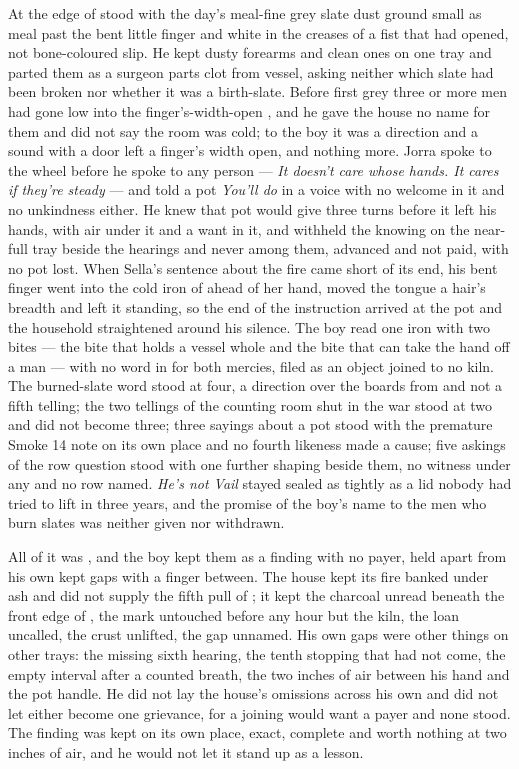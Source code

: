 At the edge of   stood with the day's meal-fine grey slate dust ground small as meal past the bent little finger and white in the creases of a fist that had opened, not bone-coloured slip. He kept dusty forearms and clean ones on one tray and parted them as a surgeon parts clot from vessel, asking neither which slate had been broken nor whether it was a birth-slate. Before first grey three or more men had gone low into the finger's-width-open , and he gave the house no name for them and did not say the room was cold; to the boy it was a direction and a sound with a door left a finger's width open, and nothing more. Jorra spoke to the wheel before he spoke to any person --- \emph{It doesn't care whose hands. It cares if they're steady} --- and told a pot \emph{You'll do} in a voice with no welcome in it and no unkindness either. He knew  that pot would give three turns before it left his hands, with air under it and a want in it, and withheld the knowing on the near-full tray beside the hearings and never among them, advanced and not paid, with no pot lost. When Sella's sentence about the fire came short of its end, his bent finger went into the cold iron of  ahead of her hand, moved the tongue a hair's breadth and left it standing, so the end of the instruction arrived at the pot and the household straightened around his silence. The boy read one iron with two bites --- the bite that holds a vessel whole and the bite that can take the hand off a man --- with no word in  for both mercies, filed as an object joined to no kiln. The burned-slate word stood at four, a direction over the boards from  and not a fifth telling; the two tellings of the counting room shut in the war stood at two and did not become three; three sayings about a pot stood with the premature Smoke 14 note on its own place and no fourth likeness made a cause; five askings of the row question stood with one further shaping beside them, no witness under any and no row named. \emph{He's not Vail} stayed sealed as tightly as a lid nobody had tried to lift in three years, and the promise of the boy's name to the men who burn slates was neither given nor withdrawn.

\scenebreak

All of it was , and the boy kept them as a finding with no payer, held apart from his own kept gaps with a finger between. The house kept its fire banked under ash and did not supply the fifth pull of ; it kept the charcoal unread beneath the front edge of , the mark untouched before any hour but the kiln, the loan uncalled, the crust unlifted, the gap unnamed. His own gaps were other things on other trays: the missing sixth hearing, the tenth stopping that had not come, the empty interval after a counted breath, the two inches of air between his hand and the pot handle. He did not lay the house's omissions across his own and did not let either become one grievance, for a joining would want a payer and none stood. The finding was kept on its own place, exact, complete and worth nothing at two inches of air, and he would not let it stand up as a lesson.

